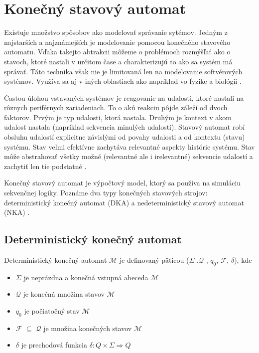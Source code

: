 \section{Konečný stavový automat}
\noindent Existuje množstvo spôsobov ako modelovať správanie sytémov. Jedným z 
najstarších a najznámejších je modelovanie pomocou konečného stavového automatu.
Vďaka takejto abtrakcii môžeme o problémoch rozmýšľať ako o stavoch, ktoré nastali v určitom čase a charakterizujú to ako sa systém má správať. 
Táto technika však nie je limitovaná len na modelovanie softvérových systémov. Využíva sa aj v iných oblastiach ako napríklad vo fyzike a biológii \cite{WaybackMachine2014}. 
\par Častou úlohou vstavaných systémov je reagovanie na udalosti, ktoré nastali  na rôznych 
periférnych zariadeniach. To o akú reakciu pôjde záleží od dvoch faktorov. Prvým je typ
udalosti, ktorá nastala. Druhým je kontext v akom udalosť nastala 
(napríklad sekvencia minulých udalostí). Stavový automat robí obsluhu udalostí explicitne závislými od povahy udalosti a od kontextu (stavu) systému. 
Stav veľmi efektívne zachytáva relevantné aspekty histórie systému. 
Stav môže abstrahovať všetky možné (relevantné ale i irelevantné) sekvencie udalostí a zachytiť len tie podstatné \cite{samekStateMachinesEventDriven2016}.
\par Konečný stavový automat je výpočtový model, ktorý sa používa na simuláciu sekvenčnej logiky. 
Poznáme dva typy konečných stavových strojov: deterministický konečný automat (DKA)  a nedeterministický stavový automat (NKA) \cite{FiniteStateMachines}. 

\subsection{Deterministický konečný automat}
\noindent Deterministický konečný automat $\mathcal{M}$ je definovaný päticou ($\Sigma$ ,$\mathcal{Q}$ , $q_0$, $\mathcal{F}$, $\delta$), kde
\begin{itemize}
    \item $\Sigma$ je neprázdna a konečná vstupná abeceda $\mathcal{M}$
    \item $\mathcal{Q}$ je konečná množina stavov $\mathcal{M}$
    \item $q_0$ je počiatočný stav $\mathcal{M}$
    \item $\mathcal{F}$ $\subseteq$ $\mathcal{Q}$ je množina konečných stavov $\mathcal{M}$
    \item $\delta$ je prechodová funkcia  \begin{math}\delta : Q \times \Sigma \Rightarrow Q\end{math}
\end{itemize}

